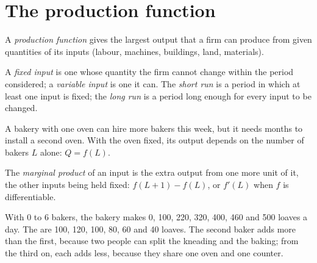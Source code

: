 \section{The production function}\label{sec:g11:production-and-costs:function}

\begin{definition}\label{def:g11:production-and-costs:production-function}
A \emph{production function} gives the largest output that a firm can produce from given quantities of its inputs (labour,
machines, buildings, land, materials).
\end{definition}

\begin{definition}\label{def:g11:production-and-costs:fixed-input}
A \emph{fixed input} is one whose quantity the firm cannot change within the period considered; a \emph{variable input}%
\label{def:g11:production-and-costs:variable-input} is one it can. The \emph{short run}%
\label{def:g11:production-and-costs:short-run} is a period in which at least one input is fixed; the \emph{long run}%
\label{def:g11:production-and-costs:long-run} is a period long enough for every input to be changed.
\end{definition}

A bakery with one oven can hire more bakers this week, but it needs months to install a second oven. With the oven fixed, its output depends on the
number of bakers $L$ alone: $Q = f(L)$.

\begin{definition}\label{def:g11:production-and-costs:marginal-product}
The \emph{marginal product} of an input is the extra output from one more unit of it, the other inputs being held fixed: $f(L + 1) -
f(L)$, or $f'(L)$ when $f$ is differentiable.
\end{definition}

\begin{example}\label{ex:g11:production-and-costs:bakers}
With 0 to 6 bakers, the bakery makes 0, 100, 220, 320, 400, 460 and 500 loaves a day. The  are 100, 120, 100, 80, 60 and 40 loaves. The
second baker adds more than the first, because two people can split the kneading and the baking; from the third on, each adds less, because they share one
oven and one counter.
\end{example}

